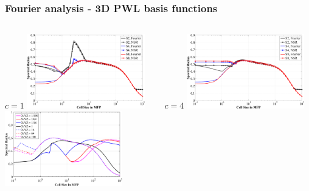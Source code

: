 \documentclass[compress,10pt]{beamer}
\begin{document}
\subsection{}
\begin{frame}[t]\frametitle{Fourier analysis - 3D PWL basis functions}
\begin{columns}
\begin{block}{$c=1$}
\centering
{}\includegraphics[width=0.8\textwidth]{images/SI_MIP_hex_C=1_LS2,4,8_F&NSR_PDT.png} \\
{}\includegraphics[width=0.8\textwidth]{images/SI_MIP_hex_LS8_C=1_AR.eps}
\end{block}
\begin{block}{$c=4$}
\centering
{}\includegraphics[width=0.8\textwidth]{images/SI_MIP_hex_C=4_LS2,4,8_F&NSR_PDT.png} \\

\end{block}
\end{columns}
\end{frame}
\end{document}

